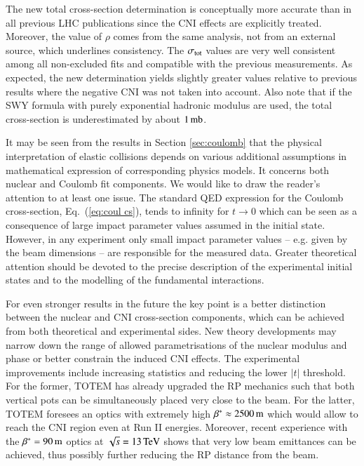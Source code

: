 The new total cross-section determination is conceptually more accurate than in all previous LHC publications since the CNI effects are explicitly treated. Moreover, the value of $\rho$ comes from the same analysis, not from an external source, which underlines consistency. The $\sigma_{\rm tot}$ values are very well consistent among all non-excluded fits and compatible with the previous measurements. As expected, the new determination yields slightly greater values relative to previous results where the negative CNI was not taken into account. Also note that if the SWY formula with purely exponential hadronic modulus are used, the total cross-section is underestimated by about $1\,{\rm mb}$.

It may be seen from the results in Section \ref{sec:coulomb} that the physical interpretation of elastic collisions depends on various additional assumptions in mathematical expression of corresponding physics models. It concerns both nuclear and Coulomb fit components. We would like to draw the reader's attention to at least one issue. The standard QED expression for the Coulomb cross-section, Eq.~(\ref{eq:coul cs}), tends to infinity for $t\to 0$ which can be seen as a consequence of large impact parameter values assumed in the initial state. However, in any experiment only small impact parameter values -- e.g. given by the beam dimensions -- are responsible for the measured data. Greater theoretical attention should be devoted to the precise description of the experimental initial states and to the modelling of the fundamental interactions.

For even stronger results in the future the key point is a better distinction between the nuclear and CNI cross-section components, which can be achieved from both theoretical and experimental sides. New theory developments may narrow down the range of allowed parametrisations of the nuclear modulus and phase or better constrain the induced CNI effects. The experimental improvements include increasing statistics and reducing the lower $|t|$ threshold. For the former, TOTEM has already upgraded the RP mechanics such that both vertical pots can be simultaneously placed very close to the beam. For the latter, TOTEM foresees an optics with extremely high $\beta^* \approx 2500\,{\rm m}$ which would allow to reach the CNI region even at Run II energies. Moreover, recent experience with the $\beta^* = 90\,{\rm m}$ optics at $\sqrt s = 13\,{\rm TeV}$ shows that very low beam emittances can be achieved, thus possibly further reducing the RP distance from the beam.
